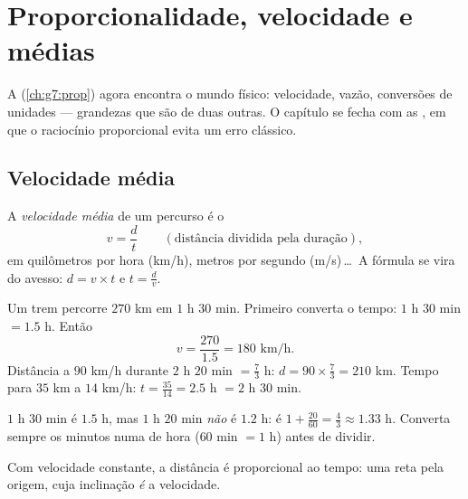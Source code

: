 \chapter{Proporcionalidade, velocidade e médias}\label{ch:g8:speed}

A  (\cref{ch:g7:prop}) agora encontra o mundo físico:
velocidade, vazão, conversões de unidades --- grandezas que são
\emph{} de duas outras. O capítulo se fecha com as , em que o raciocínio proporcional evita um erro clássico.

\section{Velocidade média}

\begin{definition}\label{def:g8:speed:def}
A \emph{velocidade média} de um percurso é o
\[
v = \frac{d}{t}
\qquad
\left(\text{distância dividida pela duração}\right),
\]
em quilômetros por hora (km/h), metros por segundo (m/s)\,\dots\ A
fórmula se vira do avesso: $d = v \times t$ e $t = \frac{d}{v}$.
\end{definition}

\begin{example}\label{ex:g8:speed:basic}
Um trem percorre $270$ km em $1$ h $30$ min. Primeiro converta o
tempo: $1$ h $30$ min $= 1.5$ h. Então
\[
v = \frac{270}{1.5} = 180 \text{ km/h}.
\]
Distância a $90$ km/h durante $2$ h $20$ min $= \frac73$ h:
$d = 90 \times \frac73 = 210$ km. Tempo para $35$ km a $14$ km/h:
$t = \frac{35}{14} = 2.5$ h $= 2$ h $30$ min.
\end{example}

\begin{remark}
$1$ h $30$ min é $1.5$ h, mas $1$ h $20$ min \emph{não} é $1.2$ h: é
$1 + \frac{20}{60} = \frac43 \approx 1.33$ h. Converta sempre os
minutos numa  de hora ($60$ min $= 1$ h) antes de dividir.
\end{remark}

\begin{omfigure}

{\small Com velocidade constante, a distância é proporcional ao tempo:
uma reta pela origem, cuja inclinação \emph{é} a velocidade.}
\end{omfigure}

